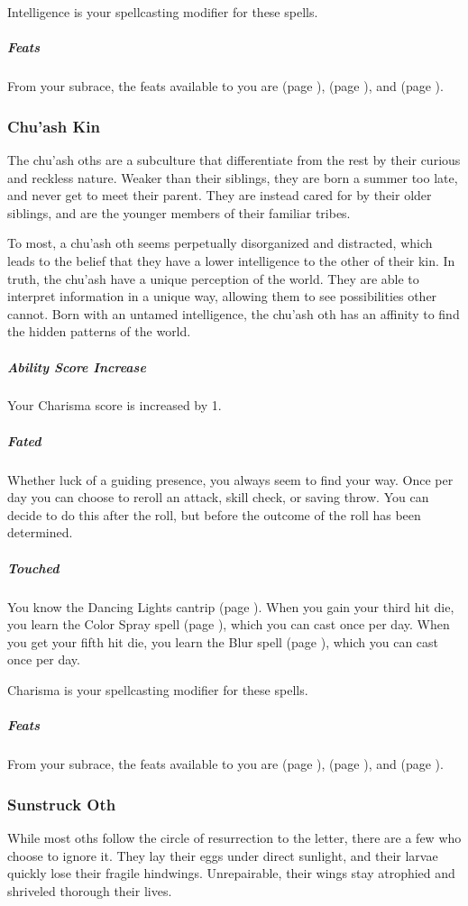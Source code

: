     Intelligence is your spellcasting modifier for these spells.

    \subparagraph{Feats} From your subrace, the feats available to you are
    \textbf{} (page \pageref{feat::}),
    \textbf{} (page \pageref{feat::}), and
    \textbf{} (page \pageref{feat::}).

\subsubsection{Chu'ash Kin}
    The chu'ash oths are a subculture that differentiate from the rest by their curious and reckless nature.
    Weaker than their siblings, they are born a summer too late, and never get to meet their parent.
    They are instead cared for by their older siblings, and are the younger members of their familiar tribes.

    To most, a chu'ash oth seems perpetually disorganized and distracted, which leads to the belief that they have a lower intelligence to the other of their kin.
    In truth, the chu'ash have a unique perception of the world.
    They are able to interpret information in a unique way, allowing them to see possibilities other cannot.
    Born with an untamed intelligence, the chu'ash oth has an affinity to find the hidden patterns of the world.

    \subparagraph{Ability Score Increase} Your Charisma score is increased by 1.

    \subparagraph{Fated} Whether luck of a guiding presence, you always seem to find your way.
    Once per day you can choose to reroll an attack, skill check, or saving throw.
    You can decide to do this after the roll, but before the outcome of the roll has been determined.

    \subparagraph{Touched} You know the Dancing Lights cantrip (page \pageref{spell::dancinglights}).
    When you gain your third hit die, you learn the Color Spray spell (page \pageref{spell::colorspray}), which you can cast once per day.
    When you get your fifth hit die, you learn the Blur spell (page \pageref{spell::blur}), which you can cast once per day.

    Charisma is your spellcasting modifier for these spells.

    \subparagraph{Feats} From your subrace, the feats available to you are
    \textbf{} (page \pageref{feat::}),
    \textbf{} (page \pageref{feat::}), and
    \textbf{} (page \pageref{feat::}).

\subsubsection{Sunstruck Oth}
    While most oths follow the circle of resurrection to the letter, there are a few who choose to ignore it.
    They lay their eggs under direct sunlight, and their larvae quickly lose their fragile hindwings.
    Unrepairable, their wings stay atrophied and shriveled thorough their lives.

